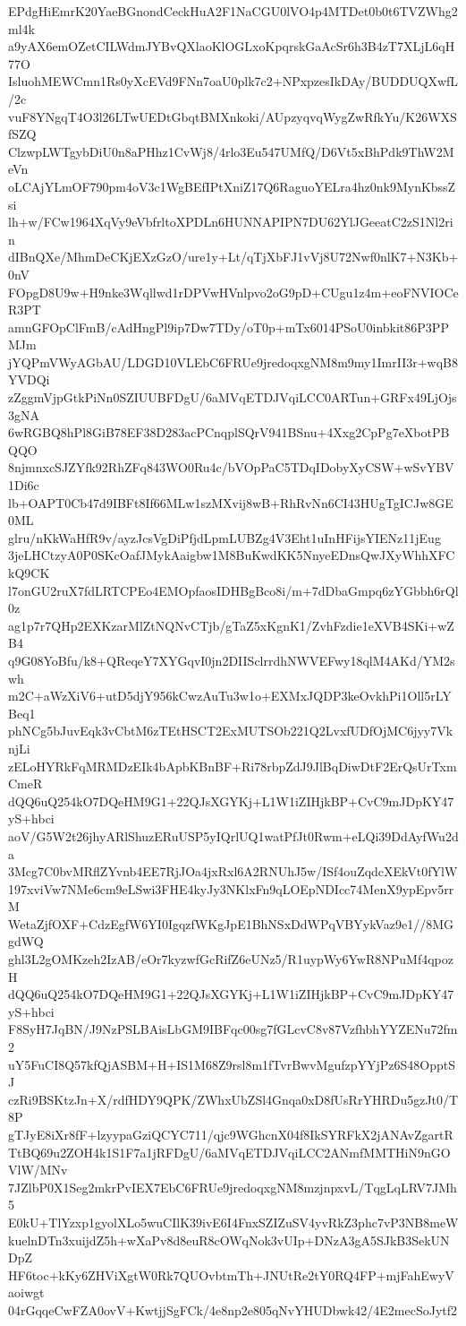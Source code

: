 EPdgHiEmrK20YaeBGnondCeckHuA2F1NaCGU0lVO4p4MTDet0b0t6TVZWhg2ml4k
a9yAX6emOZetCILWdmJYBvQXlaoKlOGLxoKpqrskGaAcSr6h3B4zT7XLjL6qH77O
IsluohMEWCmn1Rs0yXcEVd9FNn7oaU0plk7c2+NPxpzesIkDAy/BUDDUQXwfL/2c
vuF8YNgqT4O3l26LTwUEDtGbqtBMXnkoki/AUpzyqvqWygZwRfkYu/K26WXSfSZQ
ClzwpLWTgybDiU0n8aPHhz1CvWj8/4rlo3Eu547UMfQ/D6Vt5xBhPdk9ThW2MeVn
oLCAjYLmOF790pm4oV3c1WgBEfIPtXniZ17Q6RaguoYELra4hz0nk9MynKbssZsi
lh+w/FCw1964XqVy9eVbfrltoXPDLn6HUNNAPIPN7DU62YlJGeeatC2zS1Nl2rin
dIBnQXe/MhmDeCKjEXzGzO/ure1y+Lt/qTjXbFJ1vVj8U72Nwf0nlK7+N3Kb+0nV
FOpgD8U9w+H9nke3Wqllwd1rDPVwHVnlpvo2oG9pD+CUgu1z4m+eoFNVIOCeR3PT
amnGFOpClFmB/cAdHngPl9ip7Dw7TDy/oT0p+mTx6014PSoU0inbkit86P3PPMJm
jYQPmVWyAGbAU/LDGD10VLEbC6FRUe9jredoqxgNM8m9my1ImrII3r+wqB8YVDQi
zZggmVjpGtkPiNn0SZIUUBFDgU/6aMVqETDJVqiLCC0ARTun+GRFx49LjOjs3gNA
6wRGBQ8hPl8GiB78EF38D283acPCnqplSQrV941BSnu+4Xxg2CpPg7eXbotPBQQO
8njmnxcSJZYfk92RhZFq843WO0Ru4c/bVOpPaC5TDqIDobyXyCSW+wSvYBV1Di6c
lb+OAPT0Cb47d9IBFt8If66MLw1szMXvij8wB+RhRvNn6CI43HUgTgICJw8GE0ML
glru/nKkWaHfR9v/ayzJcsVgDiPfjdLpmLUBZg4V3Eht1uInHFijsYIENz11jEug
3jeLHCtzyA0P0SKcOafJMykAaigbw1M8BuKwdKK5NnyeEDnsQwJXyWhhXFCkQ9CK
l7onGU2ruX7fdLRTCPEo4EMOpfaosIDHBgBco8i/m+7dDbaGmpq6zYGbbh6rQl0z
ag1p7r7QHp2EXKzarMlZtNQNvCTjb/gTaZ5xKgnK1/ZvhFzdie1eXVB4SKi+wZB4
q9G08YoBfu/k8+QReqeY7XYGqvI0jn2DIISclrrdhNWVEFwy18qlM4AKd/YM2swh
m2C+aWzXiV6+utD5djY956kCwzAuTu3w1o+EXMxJQDP3keOvkhPi1Oll5rLYBeq1
phNCg5bJuvEqk3vCbtM6zTEtHSCT2ExMUTSOb221Q2LvxfUDfOjMC6jyy7VknjLi
zELoHYRkFqMRMDzEIk4bApbKBnBF+Ri78rbpZdJ9JlBqDiwDtF2ErQsUrTxmCmeR
dQQ6uQ254kO7DQeHM9G1+22QJsXGYKj+L1W1iZIHjkBP+CvC9mJDpKY47yS+hbci
aoV/G5W2t26jhyARlShuzERuUSP5yIQrlUQ1watPfJt0Rwm+eLQi39DdAyfWu2da
3Mcg7C0bvMRflZYvnb4EE7RjJOa4jxRxl6A2RNUhJ5w/ISf4ouZqdcXEkVt0fYlW
197xviVw7NMe6cm9eLSwi3FHE4kyJy3NKlxFn9qLOEpNDIcc74MenX9ypEpv5rrM
WetaZjfOXF+CdzEgfW6YI0IgqzfWKgJpE1BhNSxDdWPqVBYykVaz9e1//8MGgdWQ
ghl3L2gOMKzeh2IzAB/eOr7kyzwfGcRifZ6eUNz5/R1uypWy6YwR8NPuMf4qpozH
dQQ6uQ254kO7DQeHM9G1+22QJsXGYKj+L1W1iZIHjkBP+CvC9mJDpKY47yS+hbci
F8SyH7JqBN/J9NzPSLBAisLbGM9IBFqc00sg7fGLcvC8v87VzfhbhYYZENu72fm2
uY5FuCI8Q57kfQjASBM+H+IS1M68Z9rsl8m1fTvrBwvMgufzpYYjPz6S48OpptSJ
czRi9BSKtzJn+X/rdfHDY9QPK/ZWhxUbZSl4Gnqa0xD8fUsRrYHRDu5gzJt0/T8P
gTJyE8iXr8fF+lzyypaGziQCYC711/qjc9WGhcnX04f8IkSYRFkX2jANAvZgartR
TtBQ69u2ZOH4k1S1F7a1jRFDgU/6aMVqETDJVqiLCC2ANmfMMTHiN9nGOVlW/MNv
7JZlbP0X1Seg2mkrPvIEX7EbC6FRUe9jredoqxgNM8mzjnpxvL/TqgLqLRV7JMh5
E0kU+TlYzxp1gyolXLo5wuCIlK39ivE6I4FnxSZIZuSV4yvRkZ3phc7vP3NB8meW
kuelnDTn3xuijdZ5h+wXaPv8d8euR8cOWqNok3vUIp+DNzA3gA5SJkB3SekUNDpZ
HF6toc+kKy6ZHViXgtW0Rk7QUOvbtmTh+JNUtRe2tY0RQ4FP+mjFahEwyVaoiwgt
04rGqqeCwFZA0ovV+KwtjjSgFCk/4e8np2e805qNvYHUDbwk42/4E2mecSoJytf2
